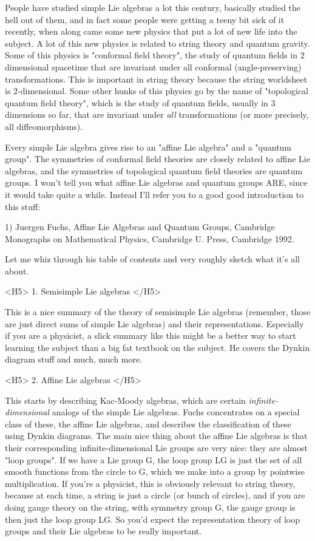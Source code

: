 People have studied simple Lie algebras a lot this century, basically
studied the hell out of them, and in fact some people were getting a
teeny bit sick of it recently, when along came some new physics that put
a lot of new life into the subject.  A lot of this new physics is
related to string theory and quantum gravity.  Some of this physics is
"conformal field theory", the study of quantum fields in 2 dimensional
spacetime that are invariant under all conformal (angle-preserving)
transformations.  This is important in string theory because the string
worldsheet is 2-dimensional.  Some other hunks of this physics go by the
name of "topological quantum field theory", which is the study of
quantum fields, usually in 3 dimensions so far, that are invariant under
\emph{all} transformations (or more precisely, all diffeomorphisms).

Every simple Lie algebra gives rise to an "affine Lie algebra" and
a "quantum group".   The symmetries of conformal field theories are
closely related to affine Lie algebras, and the symmetries of
topological quantum field theories are quantum groups.  I won't
tell you what affine Lie algebras and quantum groups ARE, since it
would take quite a while.  Instead I'll refer you to a good
good introduction to this stuff:  

1) Juergen Fuchs, Affine Lie Algebras and Quantum Groups, Cambridge
Monographs on Mathematical Physics, Cambridge U. Press, Cambridge 1992.

Let me whiz through his table of contents and very roughly sketch what
it's all about.

<H5> 1.  Semisimple Lie algebras </H5>

This is a nice summary of the theory of semisimple Lie algebras
(remember, those are just direct sums of simple Lie algebras) and their
representations.  Especially if you are a physicist, a slick summary
like this might be a better way to start learning the subject than a big
fat textbook on the subject.  He covers the Dynkin diagram stuff and
much, much more.  

<H5> 2.  Affine Lie algebras </H5>

This starts by describing Kac-Moody algebras, which are certain
\emph{infinite-dimensional} analogs of the simple Lie algebras.  Fuchs
concentrates on a special class of these, the affine Lie algebras, and
describes the classification of these using Dynkin diagrams.  The main
nice thing about the affine Lie algebras is that their corresponding
infinite-dimensional Lie groups are very nice: they are almost "loop
groups".  If we have a Lie group G, the loop group LG is just the set of
all smooth functions from the circle to G, which we make into a group by
pointwise multiplication.  If you're a physicist, this is obviously
relevant to string theory, because at each time, a string is just a
circle (or bunch of circles), and if you are doing gauge theory on 
the string, with symmetry group G, the gauge group is then just the loop
group LG.  So you'd expect the representation theory of loop groups
and their Lie algebras to be really important.  


